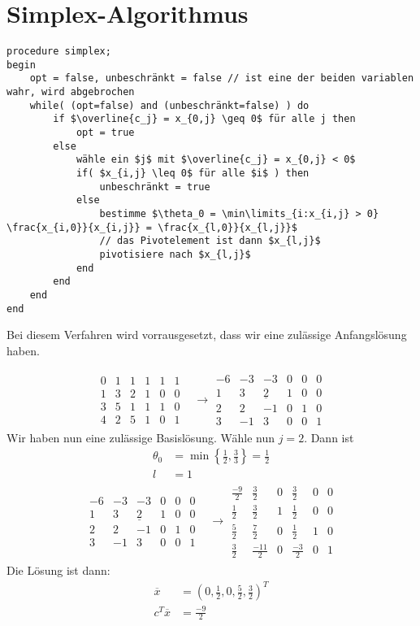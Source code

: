 \section{Simplex-Algorithmus}
\begin{verbatim}
procedure simplex;
begin
	opt = false, unbeschränkt = false // ist eine der beiden variablen wahr, wird abgebrochen
	while( (opt=false) and (unbeschränkt=false) ) do
		if $\overline{c_j} = x_{0,j} \geq 0$ für alle j then
			opt = true
		else
			wähle ein $j$ mit $\overline{c_j} = x_{0,j} < 0$
			if( $x_{i,j} \leq 0$ für alle $i$ ) then
				unbeschränkt = true	
			else
				bestimme $\theta_0 = \min\limits_{i:x_{i,j} > 0} \frac{x_{i,0}}{x_{i,j}} = \frac{x_{l,0}}{x_{l,j}}$
				// das Pivotelement ist dann $x_{l,j}$
				pivotisiere nach $x_{l,j}$
			end
		end
	end
end
\end{verbatim}
Bei diesem Verfahren wird vorrausgesetzt, dass wir eine zulässige Anfangslösung haben.
\begin{example}
\begin{align*}
\begin{matrix}
0 & 1 & 1 & 1 & 1 & 1 \\
1 & 3 & 2 & 1 & 0 & 0 \\
3 & 5 & 1 & 1 & 1 & 0 \\
4 & 2 & 5 & 1 & 0 & 1
\end{matrix}&\longrightarrow\begin{matrix}
-6 & -3 & -3 & 0 & 0 & 0 \\
1 & 3 & \underline{2} & 1 & 0 & 0 \\
2 & 2 & -1 & 0 & 1 & 0 \\
3 & -1 & 3 & 0 & 0 & 1
\end{matrix}
\end{align*}
Wir haben nun eine zulässige Basislösung.
Wähle nun $j = 2$. Dann ist
\begin{align*}
\theta_0 &= \min \left \{ \frac12, \frac33 \right \} = \frac{1}{2}\\
l &= 1
\end{align*}
\begin{align*}
\begin{matrix}
-6 & -3 & -3 & 0 & 0 & 0 \\
1 & 3 & \underline{2} & 1 & 0 & 0 \\
2 & 2 & -1 & 0 & 1 & 0 \\
3 & -1 & 3 & 0 & 0 & 1
\end{matrix}&\longrightarrow\begin{matrix}
\tfrac{-9}{2} & \tfrac{3}{2} & 0 & \tfrac{3}{2} & 0 & 0 \\
\tfrac{1}{2} & \tfrac{3}{2} & 1 & \tfrac{1}{2} & 0 & 0 \\
\tfrac{5}{2} & \tfrac{7}{2} & 0 & \tfrac{1}{2} & 1 & 0 \\
\tfrac{3}{2} & \tfrac{-11}{2} & 0 & \tfrac{-3}{2} & 0 & 1
\end{matrix}
\end{align*}
Die Lösung ist dann:
\begin{align*}
\overline{x} &= (0,\tfrac{1}{2},0,\tfrac{5}{2},\tfrac{3}{2})^T \\
c^T\overline{x} &= \tfrac{-9}{2}
\end{align*}
\end{example}

